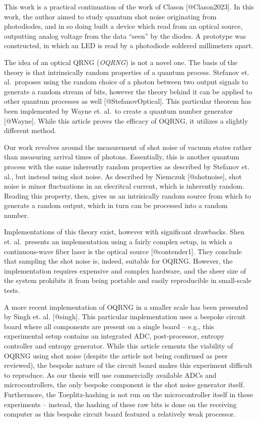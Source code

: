 \documentclass{sigchi}
\begin{document}
This work is a practical continuation of the work of Clason
{[}@Clason2023{]}. In this work, the author aimed to study quantum shot
noise originating from photodiodes, and in so doing built a device which
read from an optical source, outputting analog voltage from the data
``seen'' by the diodes. A prototype was constructed, in which an LED is
read by a photodiode soldered millimeters apart.

The idea of an optical QRNG (\emph{OQRNG}) is not a novel one. The basis
of the theory is that intrinsically random properties of a quantum
process. Stefanov et. al.~proposes using the random choice of a photon
between two output signals to generate a random stream of bits, however
the theory behind it can be applied to other quantum processes as well
{[}@StefanovOptical{]}. This particular theorem has been implemented by
Wayne et. al.~to create a quantum number generator {[}@Wayne{]}. While
this article proves the efficacy of OQRNG, it utilizes a slightly
different method.

Our work revolves around the measurement of shot noise of vacuum states
rather than measuring arrival times of photons. Essentially, this is
another quantum process with the same inherently random properties as
described by Stefanov et. al., but instead using shot noise. As
described by Niemczuk {[}@shotnoise{]}, shot noise is minor fluctuations
in an elecritcal current, which is inherently random. Reading this
property, then, gives us an intrisically random source from which to
generate a random output, which in turn can be processed into a random
number.

Implementations of this theory exist, however with significant
drawbacks. Shen et. al.~presents an implementation using a fairly
complex setup, in which a continuous-wave fiber laser is the optical
source {[}@contender1{]}. They conclude that sampling the shot noise is,
indeed, suitable for OQRNG. However, the implementation requires
expensive and complex hardware, and the sheer size of the system
prohibits it from being portable and easily reproducible in small-scale
tests.

A more recent implementation of OQRNG in a smaller scale has been
presented by Singh et. al. {[}@singh{]}. This particular implementation
uses a bespoke circuit board where all components are present on a
single board -- e.g., this experimental setup contains an integrated
ADC, post-processor, entropy controller and entropy generator. While
this article cements the viability of OQRNG using shot noise (despite
the article not being confirmed as peer reviewed), the bespoke nature of
the circuit board makes this experiment difficult to reproduce. As our
thesis will use commercially available ADCs and microcontrollers, the
only bespoke component is the shot noise generator itself. Furthermore,
the Toeplitz-hashing is not run on the microcontroller itself in these
experiments -- instead, the hashing of these raw bits is done on the
receiving computer as this bespoke circuit board featured a relatively
weak processor.
\end{document}
